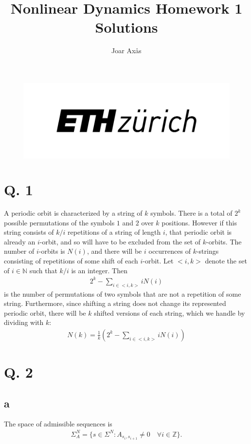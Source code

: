 \documentclass[12pt,A4]{article}
\title{Nonlinear Dynamics Homework 1 Solutions}
\author{Joar Axås}
\begin{document}
\parindent=0cm
\maketitle
\thispagestyle{empty}
\vspace{10mm}
\begin{figure}[h]
\centering
    \includegraphics[width = \linewidth]{eth.png}
\end{figure}

\newpage
\section*{Q. 1}
A periodic orbit is characterized by a string of $k$ symbols. There is a total of $2^k$ possible permutations of the symbols $1$ and $2$ over $k$ positions. However if this string consists of $k/i$ repetitions of a string of length $i$, that periodic orbit is already an $i$-orbit, and so will have to be excluded from the set of $k$-orbits. The number of $i$-orbits is $N(i)$, and there will be $i$ occurrences of $k$-strings consisting of repetitions of some shift of each $i$-orbit. Let $<i,k>$ denote the set of $i \in \mathbb{N}$ such that $k/i$ is an integer. Then 
\begin{align}
    2^k - \sum_{i \in <i,k>} i N(i)
\end{align}
is the number of permutations of two symbols that are not a repetition of some string. Furthermore, since shifting a string does not change its represented periodic orbit, there will be $k$ shifted versions of each string, which we handle by dividing with $k$:
\begin{align}
    N(k) = \frac{1}{k}\left(2^k - \sum_{i \in <i,k>} i N(i) \right)
\end{align}

\clearpage
\section*{Q. 2}
\subsection*{a}
The space of admissible sequences is
\begin{align}
    \Sigma_A^N = \{ s\in \Sigma^N : A_{s_i, s_{i+1}} \ne 0 \quad \forall i \in \mathbb{Z} \}.
\end{align}
\end{document}
